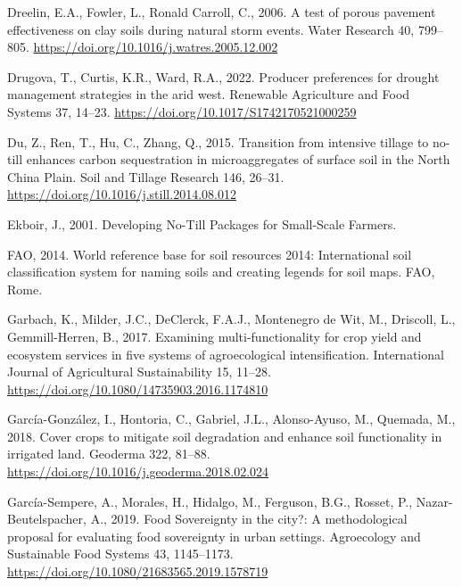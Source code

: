 \documentclass[
  12pt,
]{article}
\newlength{\cslhangindent}
\newlength{\cslentryspacingunit} %
\newenvironment{CSLReferences}[2] %
 {%
  \setlength{\parindent}{0pt}
  \ifodd #1
  \let\oldpar\par
  \def\par{\hangindent=\cslhangindent\oldpar}
  \fi
  \setlength{\parskip}{#2\cslentryspacingunit}
 }%
 {}
\begin{document}
\begin{CSLReferences}{1}{0}
\leavevmode{}%
Dreelin, E.A., Fowler, L., Ronald Carroll, C., 2006. A test of porous pavement effectiveness on clay soils during natural storm events. Water Research 40, 799--805. \url{https://doi.org/10.1016/j.watres.2005.12.002}

\leavevmode{}%
Drugova, T., Curtis, K.R., Ward, R.A., 2022. Producer preferences for drought management strategies in the arid west. Renewable Agriculture and Food Systems 37, 14--23. \url{https://doi.org/10.1017/S1742170521000259}

\leavevmode{}%
Du, Z., Ren, T., Hu, C., Zhang, Q., 2015. Transition from intensive tillage to no-till enhances carbon sequestration in microaggregates of surface soil in the {North China Plain}. Soil and Tillage Research 146, 26--31. \url{https://doi.org/10.1016/j.still.2014.08.012}

\leavevmode{}%
Ekboir, J., 2001. Developing {No-Till Packages} for {Small-Scale Farmers}.

\leavevmode{}%
FAO, 2014. World reference base for soil resources 2014: International soil classification system for naming soils and creating legends for soil maps. {FAO}, {Rome}.

\leavevmode{}%
Garbach, K., Milder, J.C., DeClerck, F.A.J., Montenegro de Wit, M., Driscoll, L., Gemmill-Herren, B., 2017. Examining multi-functionality for crop yield and ecosystem services in five systems of agroecological intensification. International Journal of Agricultural Sustainability 15, 11--28. \url{https://doi.org/10.1080/14735903.2016.1174810}

\leavevmode{}%
García-González, I., Hontoria, C., Gabriel, J.L., Alonso-Ayuso, M., Quemada, M., 2018. Cover crops to mitigate soil degradation and enhance soil functionality in irrigated land. Geoderma 322, 81--88. \url{https://doi.org/10.1016/j.geoderma.2018.02.024}

\leavevmode{}%
García-Sempere, A., Morales, H., Hidalgo, M., Ferguson, B.G., Rosset, P., Nazar-Beutelspacher, A., 2019. Food {Sovereignty} in the city?: {A} methodological proposal for evaluating food sovereignty in urban settings. Agroecology and Sustainable Food Systems 43, 1145--1173. \url{https://doi.org/10.1080/21683565.2019.1578719}


\end{CSLReferences}
\end{document}
